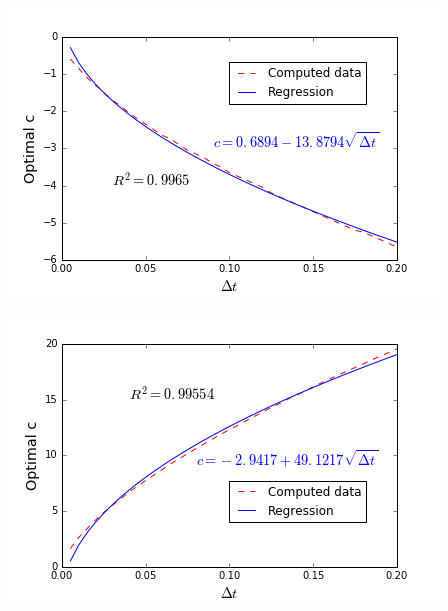 \begin{minipage}{.5\linewidth}
\begin{center}
	\includegraphics[scale=.5]{figures/FinalFigures/regressionDtFinalVersionNMarshal.png}
\end{center}
\end{minipage}
\begin{minipage}{.5\linewidth}
\begin{center}
	\includegraphics[scale=.5]{figures/FinalFigures/regressionDtFinalVersionPMarshal.png}
\end{center}
\end{minipage}

